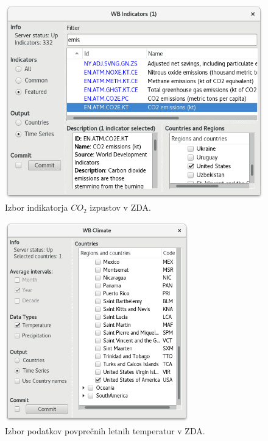 \begin{figure}
\begin{center}
\includegraphics[width=12cm]{pic/var_indicator_select.png}
\end{center}
\caption{Izbor indikatorja $CO_2$ izpustov v ZDA.}
\label{var_indicator_select}
\end{figure} 

\begin{figure}
\begin{center}
\includegraphics[width=8cm]{pic/var_climate_select.png}
\end{center}
\caption{Izbor podatkov povprečnih letnih temperatur v ZDA.}
\label{var_climate_select}
\end{figure} 

